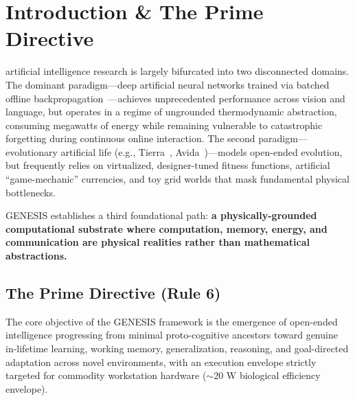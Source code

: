 \documentclass[10pt,journal,compsoc]{IEEEtran}
\begin{document}
\maketitle
\IEEEdisplaynontitleabstractindextext
\IEEEpeerreviewmaketitle

\section{Introduction \& The Prime Directive}
 artificial intelligence research is largely bifurcated into two disconnected domains. The dominant paradigm---deep artificial neural networks trained via batched offline backpropagation~\cite{vaswani2017attention}---achieves unprecedented performance across vision and language, but operates in a regime of ungrounded thermodynamic abstraction, consuming megawatts of energy while remaining vulnerable to catastrophic forgetting during continuous online interaction. The second paradigm---evolutionary artificial life (e.g., Tierra~\cite{ray1991an}, Avida~\cite{ofria2004avida})---models open-ended evolution, but frequently relies on virtualized, designer-tuned fitness functions, artificial ``game-mechanic'' currencies, and toy grid worlds that mask fundamental physical bottlenecks.

GENESIS establishes a third foundational path: \textbf{a physically-grounded computational substrate where computation, memory, energy, and communication are physical realities rather than mathematical abstractions.}

\subsection{The Prime Directive (Rule 6)}
The core objective of the GENESIS framework is the emergence of open-ended intelligence progressing from minimal proto-cognitive ancestors toward genuine in-lifetime learning, working memory, generalization, reasoning, and goal-directed adaptation across novel environments, with an execution envelope strictly targeted for commodity workstation hardware ($\sim 20\text{ W}$ biological efficiency envelope).
\end{document}
